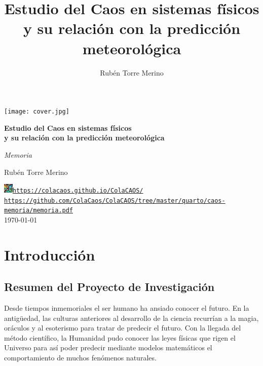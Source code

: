 \documentclass[
  10pt,
  a4paper,
  DIV=11,
  numbers=noendperiod,
  open=any]{scrreprt}
\title{Estudio del Caos en sistemas físicos y su relación con la
predicción meteorológica}
\author{Rubén Torre Merino}
\date{}
\numberwithin{equation}{chapter}
\renewcommand{\contentsname}{Tabla de contenidos}
\renewcommand*\contentsname{Table of contents}
\newcommand\contentsname{Table of contents}
\numberwithin{equation}{section}
\renewcommand{\[}{\begin{equation}}
\renewcommand{\]}{\end{equation}}
\begin{document}
\begin{titlepage}
  \centering
  \vspace*{2cm}
  \texttt{[image: cover.jpg]}\par
  \vspace{1.2cm}

  {\Huge\bfseries\color{Main} Estudio del Caos en sistemas físicos\\[2mm]
  y su relación con la predicción meteorológica\par}

  \vspace{0.8cm}
  {\Large\color{gray!90} \textit{Memoria}}\par

  \vspace{1.2cm}
  {\Large Rubén Torre Merino}\par

  \vfill
  \href{https://colacaos.github.io/ColaCAOS/}{\includegraphics[height=1.2em]{favicon.png}\hspace{0.3em}\texttt{https://colacaos.github.io/ColaCAOS/}} \\[0.8cm]


  \href{https://github.com/ColaCaos/ColaCAOS/tree/master/quarto/caos-memoria/memoria.pdf}{\faGithub\hspace{0.3em}\texttt{https://github.com/ColaCaos/ColaCAOS/tree/master/quarto/caos-memoria/memoria.pdf}} \\[1cm]

  {\large \today}\par
\end{titlepage}


\renewcommand*\contentsname{Índice}
{
\hypersetup{linkcolor=}
\setcounter{tocdepth}{0}
\tableofcontents
}


\part{Introducción}

\chapter{Resumen del Proyecto de
Investigación}\label{resumen-del-proyecto-de-investigaciuxf3n}

Desde tiempos inmemoriales el ser humano ha ansiado conocer el futuro.
En la antigüedad, las culturas anteriores al desarrollo de la ciencia
recurrían a la magia, oráculos y al esoterismo para tratar de predecir
el futuro. Con la llegada del método científico, la Humanidad pudo
conocer las leyes físicas que rigen el Universo para así poder predecir mediante modelos matemáticos el comportamiento de muchos fenómenos naturales. 
\end{document}
